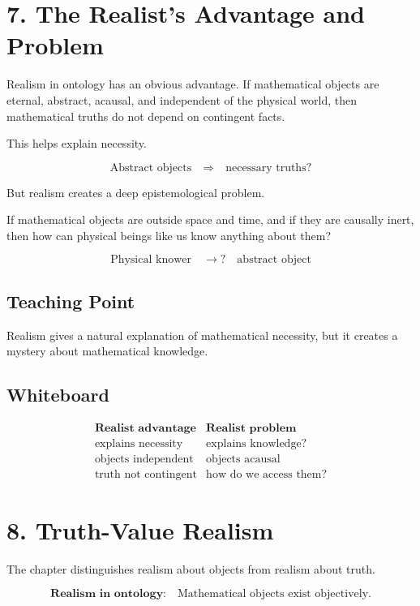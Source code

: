 \documentclass[11pt]{article}
\begin{document}
\section*{7. The Realist's Advantage and Problem}

Realism in ontology has an obvious advantage. If mathematical objects are eternal,
abstract, acausal, and independent of the physical world, then mathematical truths do not
depend on contingent facts.

This helps explain necessity.

\[
\text{Abstract objects}
\quad \Rightarrow \quad
\text{necessary truths?}
\]

But realism creates a deep epistemological problem.

If mathematical objects are outside space and time, and if they are causally inert, then how
can physical beings like us know anything about them?

\[
\text{Physical knower}
\quad \longrightarrow ? \quad
\text{abstract object}
\]

\subsection*{Teaching Point}

Realism gives a natural explanation of mathematical necessity, but it creates a mystery
about mathematical knowledge.

\subsection*{Whiteboard}

\[
\begin{array}{c|c}
\textbf{Realist advantage} & \textbf{Realist problem} \\
\hline
\text{explains necessity} & \text{explains knowledge?} \\
\text{objects independent} & \text{objects acausal} \\
\text{truth not contingent} & \text{how do we access them?}
\end{array}
\]

\section*{8. Truth-Value Realism}

The chapter distinguishes realism about objects from realism about truth.

\[
\textbf{Realism in ontology:}
\quad
\text{Mathematical objects exist objectively.}
\]
\end{document}
